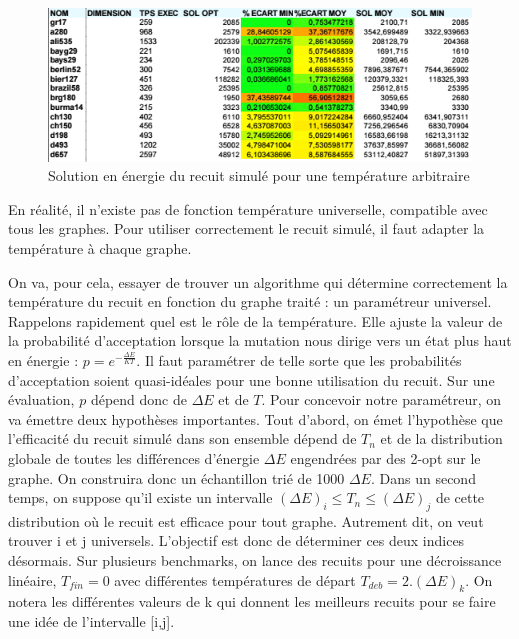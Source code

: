 \documentclass{article}%
\begin{document}
	\begin{figure}[!h]
	\begin{center}
	\includegraphics[scale=0.4]{perf_random_sa.png}
	\caption{Solution en énergie du recuit simulé pour une température arbitraire}
	\label{perf_random_sa}
	\end{center}
	\end{figure}
	
		En réalité, il n'existe pas de fonction température universelle, compatible avec tous les graphes. Pour utiliser correctement le recuit simulé, il faut adapter la température à chaque graphe.
		
		\vspace{1cm}
		
		On va, pour cela, essayer de trouver un algorithme qui détermine correctement la température du recuit en fonction du graphe traité : un paramétreur universel.
		Rappelons rapidement quel est le rôle de la température. Elle ajuste la valeur de la probabilité d'acceptation lorsque la mutation nous dirige vers un état plus haut en énergie : $ p = e^{-\frac{\Delta E}{KT}} $. Il faut paramétrer de telle sorte que les probabilités d'acceptation soient quasi-idéales pour une bonne utilisation du recuit. Sur une évaluation, $ p $  dépend donc de $ \Delta E $ et de $ T $. 
		Pour concevoir notre paramétreur, on va émettre deux hypothèses importantes. Tout d'abord, on émet l'hypothèse que l'efficacité du recuit simulé dans son ensemble dépend de $ T_{n} $ et de la distribution globale de toutes les différences d'énergie $ \Delta E $ engendrées par des 2-opt sur le graphe. On construira donc un échantillon trié de 1000 $ \Delta E $. Dans un second temps, on suppose qu'il existe un intervalle $ (\Delta E)_{i} \leq T_{n} \leq (\Delta E)_{j} $ de cette distribution où le recuit est efficace pour tout graphe. Autrement dit, on veut trouver i et j universels. 
		L'objectif est donc de déterminer ces deux indices désormais. Sur plusieurs benchmarks, on lance des recuits pour une décroissance linéaire, $ T_{fin} = 0 $ avec différentes températures de départ $ T_{deb} = 2.(\Delta E)_{k} $. On notera les différentes valeurs de k qui donnent les meilleurs recuits pour se faire une idée de l'intervalle [i,j].
		
\end{document}
